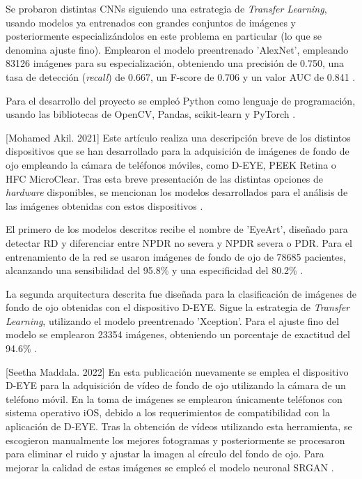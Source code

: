Se probaron distintas CNNs siguiendo una estrategia de \textit{Transfer Learning}, usando modelos ya entrenados con grandes conjuntos de imágenes y posteriormente especializándolos en este problema en particular (lo que se denomina ajuste fino). Emplearon el modelo preentrenado 'AlexNet', empleando 83126 imágenes para su especialización, obteniendo una precisión de 0.750, una tasa de detección (\textit{recall}) de 0.667, un F-score de 0.706 y un valor AUC de 0.841 \cite{soa:mueller}.

Para el desarrollo del proyecto se empleó Python como lenguaje de programación, usando las bibliotecas de OpenCV, Pandas, scikit-learn y PyTorch \cite{soa:mueller}.

[Mohamed Akil. 2021] Este artículo realiza una descripción breve de los distintos dispositivos que se han desarrollado para la adquisición de imágenes de fondo de ojo empleando la cámara de teléfonos móviles, como D-EYE, PEEK Retina o HFC MicroClear. Tras esta breve presentación de las distintas opciones de \textit{hardware} disponibles, se mencionan los modelos desarrollados para el análisis de las imágenes obtenidas con estos dispositivos \cite{soa:mohamed}. 

El primero de los modelos descritos recibe el nombre de 'EyeArt', diseñado para detectar RD y diferenciar entre NPDR no severa y NPDR severa o PDR. Para el entrenamiento de la red se usaron imágenes de fondo de ojo de 78685 pacientes, alcanzando una sensibilidad del 95.8\% y una especificidad del 80.2\% \cite{soa:mohamed}.

La segunda arquitectura descrita fue diseñada para la clasificación de imágenes de fondo de ojo obtenidas con el dispositivo D-EYE. Sigue la estrategia de \textit{Transfer Learning}, utilizando el modelo preentrenado 'Xception'. Para el ajuste fino del modelo se emplearon 23354 imágenes, obteniendo un porcentaje de exactitud del 94.6\% \cite{soa:mohamed}.

[Seetha Maddala. 2022] En esta publicación nuevamente se emplea el dispositivo D-EYE para la adquisición de vídeo de fondo de ojo utilizando la cámara de un teléfono móvil. En la toma de imágenes se emplearon únicamente teléfonos con sistema operativo iOS, debido a los requerimientos de compatibilidad con la aplicación de D-EYE. Tras la obtención de vídeos utilizando esta herramienta, se escogieron manualmente los mejores fotogramas y posteriormente se procesaron para eliminar el ruido y ajustar la imagen al círculo del fondo de ojo. Para mejorar la calidad de estas imágenes se empleó el modelo neuronal SRGAN \cite{soa:seetha}. 

